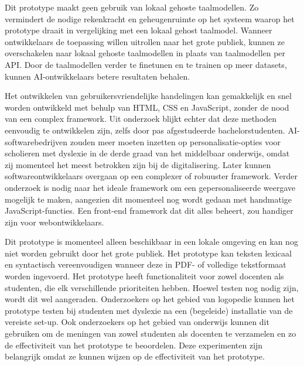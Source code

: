 \medspace

Dit prototype maakt geen gebruik van lokaal gehoste taalmodellen. Zo vermindert de nodige rekenkracht en geheugenruimte op het systeem waarop het prototype draait in vergelijking met een lokaal gehost taalmodel. Wanneer ontwikkelaars de toepassing willen uitrollen naar het grote publiek, kunnen ze overschakelen naar lokaal gehoste taalmodellen in plaats van taalmodellen per API. Door de taalmodellen verder te finetunen en te trainen op meer datasets, kunnen AI-ontwikkelaars betere resultaten behalen. 

\medspace

Het ontwikkelen van gebruikersvriendelijke handelingen kan gemakkelijk en snel worden ontwikkeld met behulp van HTML, CSS en JavaScript, zonder de nood van een complex framework. Uit onderzoek blijkt echter dat deze methoden eenvoudig te ontwikkelen zijn, zelfs door pas afgestudeerde bachelorstudenten. AI-softwarebedrijven zouden meer moeten inzetten op personalisatie-opties voor scholieren met dyslexie in de derde graad van het middelbaar onderwijs, omdat zij momenteel het meest betrokken zijn bij de digitalisering. Later kunnen softwareontwikkelaars overgaan op een complexer of robuuster framework. Verder onderzoek is nodig naar het ideale framework om een gepersonaliseerde weergave mogelijk te maken, aangezien dit momenteel nog wordt gedaan met handmatige JavaScript-functies. Een front-end framework dat dit alles beheert, zou handiger zijn voor webontwikkelaars.

\medspace

Dit prototype is momenteel alleen beschikbaar in een lokale omgeving en kan nog niet worden gebruikt door het grote publiek. Het prototype kan teksten lexicaal en syntactisch vereenvoudigen wanneer deze in PDF- of volledige tekstformaat worden ingevoerd. Het prototype heeft functionaliteit voor zowel docenten als studenten, die elk verschillende prioriteiten hebben. Hoewel testen nog nodig zijn, wordt dit wel aangeraden. Onderzoekers op het gebied van logopedie kunnen het prototype testen bij studenten met dyslexie na een (begeleide) installatie van de vereiste set-up. Ook onderzoekers op het gebied van onderwijs kunnen dit gebruiken om de meningen van zowel studenten als docenten te verzamelen en zo de effectiviteit van het prototype te beoordelen. Deze experimenten zijn belangrijk omdat ze kunnen wijzen op de effectiviteit van het prototype.

